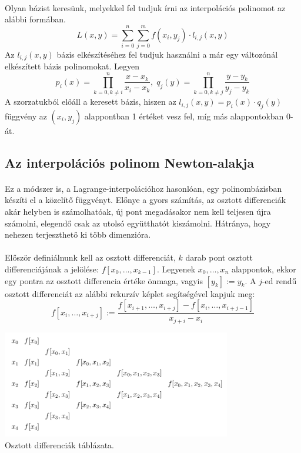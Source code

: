 \documentclass[12pt]{report}
\begin{document}
\paragraph{}
Olyan bázist keresünk, melyekkel fel tudjuk írni az interpolációs polinomot az alábbi formában.
$$
L(x, y) = \sum_{i=0}^{n}\sum_{j=0}^{m}f(x_i, y_j) \cdot l_{i, j}(x, y)
$$
Az $l_{i, j}(x,y)$ bázis elkészítéséhez fel tudjuk használni a már egy változónál elkészített bázis polinomokat. Legyen
$$
p_i(x) = \prod_{k = 0, k \neq i}^{n}\frac{x-x_k}{x_i-x_k},\; q_j(y) = \prod_{k = 0, k \neq j}^{n}\frac{y-y_k}{y_j-y_k}
$$
A szorzatukból előáll a keresett bázis, hiszen az $l_{i, j}(x,y) = p_i(x)\cdot q_j(y)$ függvény az $(x_i, y_j)$ alappontban 1 értéket vesz fel, míg más alappontokban 0-át.
\newpage
\subsection{Az interpolációs polinom Newton-alakja}
\paragraph{}
Ez a módszer is, a Lagrange-interpolációhoz hasonlóan, egy polinombázisban készíti el a közelítő függvényt. Előnye a gyors számítás, az osztott differenciák akár helyben is számolhatóak, új pont megadásakor nem kell teljesen újra számolni, elegendő csak az utolsó együtthatót kiszámolni. Hátránya, hogy nehezen terjeszthető ki több dimenzióra.
\paragraph{}
Először definiálnunk kell az osztott differenciát, $k$ darab pont osztott differenciájának a jelölése: $f[x_0, \dots, x_{k-1}]$. Legyenek $x_0, \dots, x_n$ alappontok, ekkor egy pontra az osztott differencia értéke önmaga, vagyis $[y_k] := y_k$. A $j$-ed rendű osztott differenciát az alábbi rekurzív képlet segítségével kapjuk meg:
$$
f[x_i, \dots, x_{i+j}] := \frac{f[x_{i+1}, \dots, x_{i+j}] - f[x_{i}, \dots, x_{i+j-1}]}{x_{j+i} - x_i}
$$
\begin{center}
\includegraphics[width=10cm]{pics/divide_difference_table}\\
{\footnotesize Osztott differenciák táblázata.}
\end{center}
\end{document}
